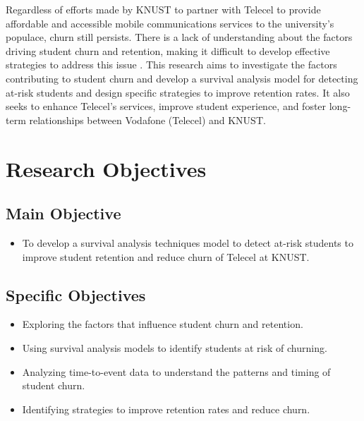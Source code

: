 \documentclass[12pt]{report} %
\begin{document}
Regardless of efforts made by KNUST to partner with Telecel to provide affordable and accessible mobile communications services to the university’s populace, churn still persists. There is a lack of understanding about the factors driving student churn and retention, making it difficult to develop effective strategies to address this issue \cite{kapur2018}. This research aims to investigate the factors contributing to student churn and develop a survival analysis model for detecting at-risk students and design specific strategies to improve retention rates. It also seeks to enhance Telecel’s services, improve student experience, and foster long-term relationships between Vodafone (Telecel) and KNUST.

\section{Research Objectives}

\subsection{Main Objective}
\begin{itemize}
    \item To develop a survival analysis techniques model to detect at-risk students to improve student retention and reduce churn of Telecel at KNUST.
\end{itemize}

\subsection{Specific Objectives}
\begin{itemize}
    \item Exploring the factors that influence student churn and retention.
    \item Using survival analysis models to identify students at risk of churning.
    \item Analyzing time-to-event data to understand the patterns and timing of student churn.
    \item Identifying strategies to improve retention rates and reduce churn.
\end{itemize}
\end{document}
